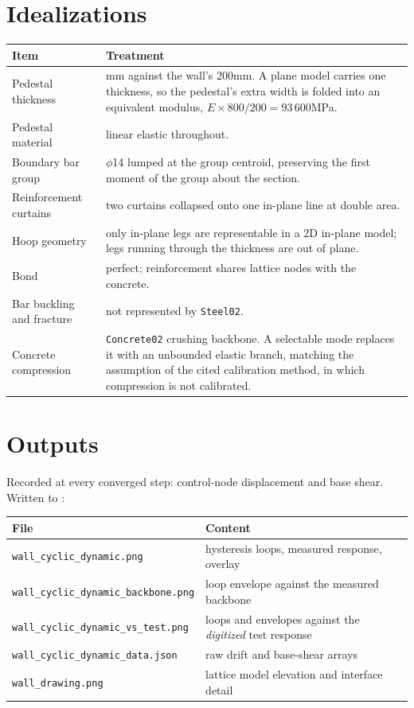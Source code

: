 \documentclass[11pt,a4paper]{article}
\begin{document}
\section{Idealizations}\label{sec:ideal}

\begin{tabularx}{\textwidth}{@{}p{46mm}>{\raggedright\arraybackslash}X@{}}
\toprule
\textbf{Item} & \textbf{Treatment} \\
\midrule
Pedestal thickness & 800\unit{mm} against the wall's 200\unit{mm}. A plane model carries one
thickness, so the pedestal's extra width is folded into an equivalent modulus,
$E \times 800/200 = 93\,600$\unit{MPa}. \\
Pedestal material & linear elastic throughout. \\
Boundary bar group & 4$\phi$14 lumped at the group centroid, preserving the first moment of the
group about the section. \\
Reinforcement curtains & two curtains collapsed onto one in-plane line at double area. \\
Hoop geometry & only in-plane legs are representable in a 2D in-plane model; legs running through
the thickness are out of plane. \\
Bond & perfect; reinforcement shares lattice nodes with the concrete. \\
Bar buckling and fracture & not represented by \texttt{Steel02}. \\
Concrete compression & \texttt{Concrete02} crushing backbone. A selectable mode replaces it with an
unbounded elastic branch, matching the assumption of the cited calibration method, in which
compression is not calibrated. \\
\bottomrule
\end{tabularx}

\section{Outputs}

Recorded at every converged step: control-node displacement and base shear. Written to
:

\small
\begin{tabularx}{\textwidth}{@{}p{62mm}>{\raggedright\arraybackslash}X@{}}
\toprule
\textbf{File} & \textbf{Content} \\
\midrule
\texttt{wall\_cyclic\_dynamic.png} & hysteresis loops, measured response, overlay \\
\texttt{wall\_cyclic\_dynamic\_backbone.png} & loop envelope against the measured backbone \\
\texttt{wall\_cyclic\_dynamic\_vs\_test.png} & loops and envelopes against the \emph{digitized} test response \\
\texttt{wall\_cyclic\_dynamic\_data.json} & raw drift and base-shear arrays \\
\texttt{wall\_drawing.png} & lattice model elevation and interface detail \\
\bottomrule
\end{tabularx}
\normalsize
\end{document}
